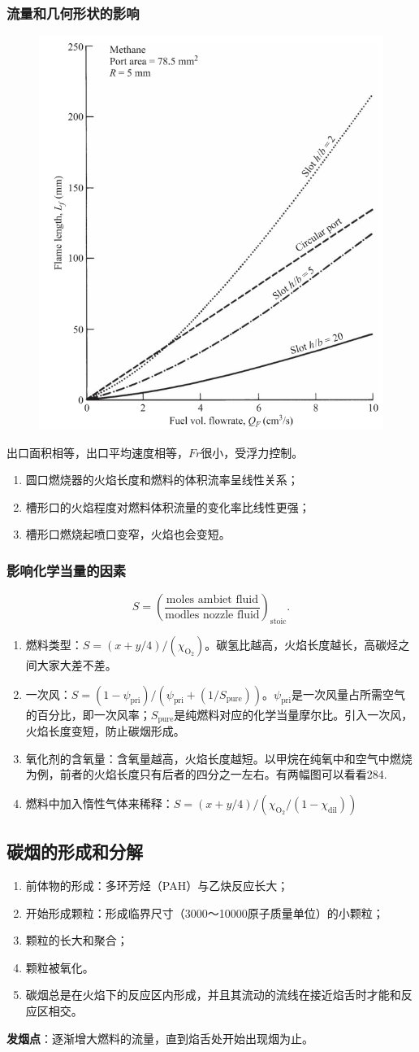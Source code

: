 \subsubsection{流量和几何形状的影响}
\begin{multicols}{2}
    \begin{figure}[H]
        \centering
        \includegraphics[width=.15\textwidth]{img/laminar_length.png}
    \end{figure}
    {
        \tiny
        出口面积相等，出口平均速度相等，\(Fr\)很小，受浮力控制。
        \begin{enumerate}
            \item 圆口燃烧器的火焰长度和燃料的体积流率呈线性关系；
            \item 槽形口的火焰程度对燃料体积流量的变化率比线性更强；
            \item 槽形口燃烧起喷口变窄，火焰也会变短。
        \end{enumerate}
    }
\end{multicols}

\subsubsection{影响化学当量的因素}

\begin{equation}
    S = \left(\frac{\text{moles ambiet fluid}}{\text{modles nozzle fluid}}\right)_\text{stoic}.
\end{equation}

\begin{enumerate}
    \item 燃料类型：\(S = (x+y/4)/(\chi_\mathrm{O_2})\)。碳氢比越高，火焰长度越长，高碳烃之间大家大差不差。
    \item 一次风：\(S = (1-\psi_\text{pri})/(\psi_\text{pri}+(1/S_\text{pure}))\)。\(\psi_\text{pri}\)是一次风量占所需空气的百分比，即一次风率；\(S_\text{pure}\)是纯燃料对应的化学当量摩尔比。引入一次风，火焰长度变短，防止碳烟形成。
    \item 氧化剂的含氧量：含氧量越高，火焰长度越短。以甲烷在纯氧中和空气中燃烧为例，前者的火焰长度只有后者的四分之一左右。有两幅图可以看看284.
    \item 燃料中加入惰性气体来稀释：\(S = (x+y/4)/(\chi_\mathrm{O_2}/(1-\chi_\text{dil}))\)
\end{enumerate}

\subsection{碳烟的形成和分解}

\begin{enumerate}
    \item 前体物的形成：多环芳烃（PAH）与乙炔反应长大；
    \item 开始形成颗粒：形成临界尺寸（3000～10000原子质量单位）的小颗粒；
    \item 颗粒的长大和聚合；
    \item 颗粒被氧化。
    \item 碳烟总是在火焰下的反应区内形成，并且其流动的流线在接近焰舌时才能和反应区相交。
\end{enumerate}

\textbf{发烟点}：逐渐增大燃料的流量，直到焰舌处开始出现烟为止。